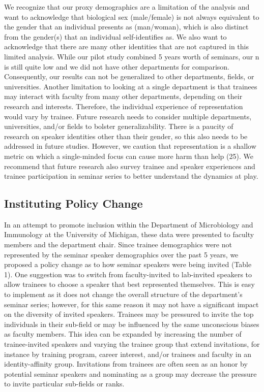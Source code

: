 \documentclass[10pt,]{article}
\begin{document}
We recognize that our proxy demographics are a limitation of the
analysis and want to acknowledge that biological sex (male/female) is
not always equivalent to the gender that an individual presents as
(man/woman), which is also distinct from the gender(s) that an
individual self-identifies as. We also want to acknowledge that there
are many other identities that are not captured in this limited
analysis. While our pilot study combined 5 years worth of seminars, our
n is still quite low and we did not have other departments for
comparison. Consequently, our results can not be generalized to other
departments, fields, or universities. Another limitation to looking at a
single department is that trainees may interact with faculty from many
other departments, depending on their research and interests. Therefore,
the individual experience of representation would vary by trainee.
Future research needs to consider multiple departments, universities,
and/or fields to bolster generalizability. There is a paucity of
research on speaker identities other than their gender, so this also
needs to be addressed in future studies. However, we caution that
representation is a shallow metric on which a single-minded focus can
cause more harm than help (25). We recommend that future research also
survey trainee and speaker experiences and trainee participation in
seminar series to better understand the dynamics at play.

\subsection{Instituting Policy Change}\label{instituting-policy-change}

In an attempt to promote inclusion within the Department of Microbiology
and Immunology at the University of Michigan, these data were presented
to faculty members and the department chair. Since trainee demographics
were not represented by the seminar speaker demographics over the past 5
years, we proposed a policy change as to how seminar speakers were being
invited (Table 1). One suggestion was to switch from faculty-invited to
lab-invited speakers to allow trainees to choose a speaker that best
represented themselves. This is easy to implement as it does not change
the overall structure of the department's seminar series; however, for
this same reason it may not have a significant impact on the diversity
of invited speakers. Trainees may be pressured to invite the top
individuals in their sub-field or may be influenced by the same
unconscious biases as faculty members. This idea can be expanded by
increasing the number of trainee-invited speakers and varying the
trainee group that extend invitations, for instance by training program,
career interest, and/or trainees and faculty in an identity-affinity
group. Invitations from trainees are often seen as an honor by potential
seminar speakers and nominating as a group may decrease the pressure to
invite particular sub-fields or ranks.
\end{document}
